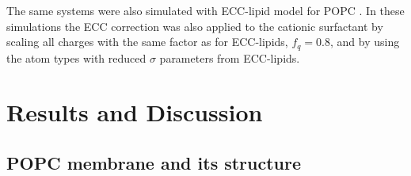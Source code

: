 \documentclass[aip,jcp,twocolumn]{revtex4}
\begin{document}
The same systems were also simulated with ECC-lipid model for POPC .
In these simulations the ECC correction was also applied to the cationic surfactant 
by scaling all  
charges with the same factor as for ECC-lipids, $f_q=0.8$, 
and by using the atom types with reduced $\sigma$ parameters from ECC-lipids. 



\section{Results and Discussion}

\subsection{POPC membrane and its structure}
\end{document}
